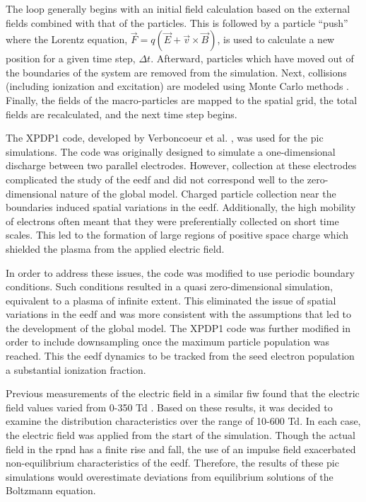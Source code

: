 The loop generally begins with an initial field calculation based on the
external fields combined with that of the particles. This is followed by a
particle ``push'' where the Lorentz equation, $\vec{F} = q(\vec{E} +
\vec{v}\times\vec{B})$, is used to calculate a new position for a given time
step, $\Delta t$. Afterward, particles which have moved out of the boundaries of
the system are removed from the simulation. Next, collisions (including
ionization and excitation) are modeled using Monte Carlo methods
\cite{Birdsall1991}. Finally, the fields of the macro-particles are mapped to
the spatial grid, the total fields are recalculated, and the next time step
begins.

The XPDP1 code, developed by Verboncoeur et al. \cite{Verboncoeur1993}, was used
for the \acs{pic} simulations. The code was originally designed to simulate a
one-dimensional discharge between two parallel electrodes. However, collection
at these electrodes complicated the study of the \acs{eedf} and did not
correspond well to the zero-dimensional nature of the global model. Charged
particle collection near the boundaries induced spatial variations in the
\acs{eedf}. Additionally, the high mobility of electrons often meant that they
were preferentially collected on short time scales. This led to the formation
of large regions of positive space charge which shielded the plasma from the
applied electric field.

In order to address these issues, the code was modified to use periodic boundary
conditions. Such conditions resulted in a quasi zero-dimensional simulation,
equivalent to a plasma of infinite extent. This eliminated the issue of spatial
variations in the \acs{eedf} and was more consistent with the assumptions that
led to the development of the global model. The XPDP1 code was further modified
in order to include downsampling once the maximum particle population was
reached. This the \acs{eedf} dynamics to be tracked from the seed electron
population a substantial ionization fraction.

Previous measurements of the electric field in a similar \acs{fiw} found that
the electric field values varied from 0-350 Td \cite{Takashima2011}. Based on
these results, it was decided to examine the distribution characteristics over
the range of 10-600 Td. In each case, the electric field was applied from the
start of the simulation. Though the actual field in the \acs{rpnd} has a finite
rise and fall, the use of an impulse field exacerbated non-equilibrium
characteristics of the \acs{eedf}. Therefore, the results of these \acs{pic}
simulations would overestimate deviations from equilibrium solutions of the
Boltzmann equation.

